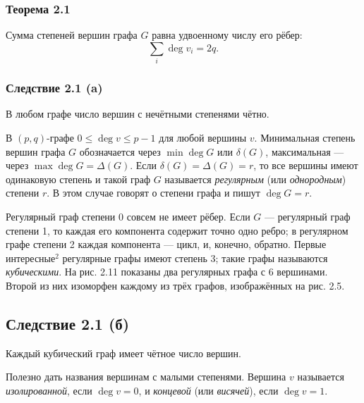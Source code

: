 \subsubsection*{Теорема 2.1}
Сумма степеней вершин графа \(G\) равна удвоенному числу его рёбер:
\[
\sum_i \deg v_i = 2q.
\]

\subsubsection*{Следствие 2.1 (a)}
В любом графе число вершин с нечётными степенями чётно.

В \((p, q)\)-графе \(0 \leq \deg v \leq p-1\) для любой вершины \(v\). Минимальная степень вершин графа \(G\) обозначается через \(\min \deg G\) или \(\delta(G)\), максимальная — через \(\max \deg G = \Delta(G)\). Если \(\delta(G) = \Delta(G) = r\), то все вершины имеют одинаковую степень и такой граф \(G\) называется \textit{регулярным} (или \textit{однородным}) степени \(r\). В этом случае говорят о степени графа и пишут \(\deg G = r\).

Регулярный граф степени 0 совсем не имеет рёбер. Если \(G\) — регулярный граф степени 1, то каждая его компонента содержит точно одно ребро; в регулярном графе степени 2 каждая компонента — цикл, и, конечно, обратно. Первые интересные\(^2\) регулярные графы имеют степень 3; такие графы называются \textit{кубическими}. На рис. 2.11 показаны два регулярных графа с 6 вершинами. Второй из них изоморфен каждому из трёх графов, изображённых на рис. 2.5.

\subsection*{Следствие 2.1 (б)}
Каждый кубический граф имеет чётное число вершин.

Полезно дать названия вершинам с малыми степенями. Вершина \(v\) называется \textit{изолированной}, если \(\deg v = 0\), и \textit{концевой} (или \textit{висячей}), если \(\deg v = 1\).
